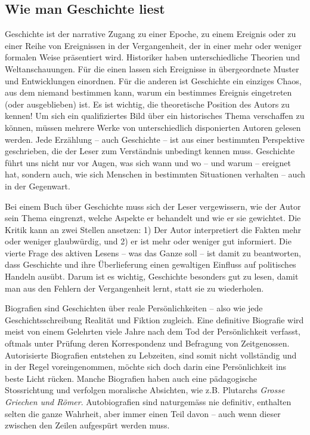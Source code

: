 \documentclass[a4paper,11pt]{scrartcl}
\begin{document}
\subsection{Wie man Geschichte liest}

Geschichte ist der narrative Zugang zu einer Epoche, zu einem Ereignis oder zu einer Reihe von Ereignissen in der Vergangenheit, der in einer mehr oder weniger formalen Weise präsentiert wird. Historiker haben unterschiedliche Theorien und Weltanschauungen. Für die einen lassen sich Ereignisse in übergeordnete Muster und Entwicklungen einordnen. Für die anderen ist Geschichte ein einziges Chaos, aus dem niemand bestimmen kann, warum ein bestimmes Ereignis eingetreten (oder ausgeblieben) ist. Es ist wichtig, die theoretische Position des Autors zu kennen! Um sich ein qualifiziertes Bild über ein historisches Thema verschaffen zu können, müssen mehrere Werke von unterschiedlich disponierten Autoren gelesen werden. Jede Erzählung – auch Geschichte – ist aus einer bestimmten Perspektive geschrieben, die der Leser zum Verständnis unbedingt kennen muss. Geschichte führt uns nicht nur vor Augen, was sich wann und wo – und warum – ereignet hat, sondern auch, wie sich Menschen in bestimmten Situationen verhalten – auch in der Gegenwart.

Bei einem Buch über Geschichte muss sich der Leser vergewissern, wie der Autor sein Thema eingrenzt, welche Aspekte er behandelt und wie er sie gewichtet. Die Kritik kann an zwei Stellen ansetzen: 1) Der Autor interpretiert die Fakten mehr oder weniger glaubwürdig, und 2) er ist mehr oder weniger gut informiert. Die vierte Frage des aktiven Lesens – was das Ganze soll – ist damit zu beantworten, dass Geschichte und ihre Überlieferung einen gewaltigen Einfluss auf politisches Handeln ausübt. Darum ist es wichtig, Geschichte besonders gut zu lesen, damit man aus den Fehlern der Vergangenheit lernt, statt sie zu wiederholen.

Biografien sind Geschichten über reale Persönlichkeiten – also wie jede Geschichtsschreibung Realität und Fiktion zugleich. Eine definitive Biografie wird meist von einem Gelehrten viele Jahre nach dem Tod der Persönlichkeit verfasst, oftmals unter Prüfung deren Korrespondenz und Befragung von Zeitgenossen. Autorisierte Biografien entstehen zu Lebzeiten, sind somit nicht vollständig und in der Regel voreingenommen, möchte sich doch darin eine Persönlichkeit ins beste Licht rücken. Manche Biografien haben auch eine pädagogische Stossrichtung und verfolgen moralische Absichten, wie z.B. Plutarchs \textit{Grosse Griechen und Römer}. Autobiografien sind naturgemäss nie definitiv, enthalten selten die ganze Wahrheit, aber immer einen Teil davon – auch wenn dieser zwischen den Zeilen aufgespürt werden muss.
\end{document}
